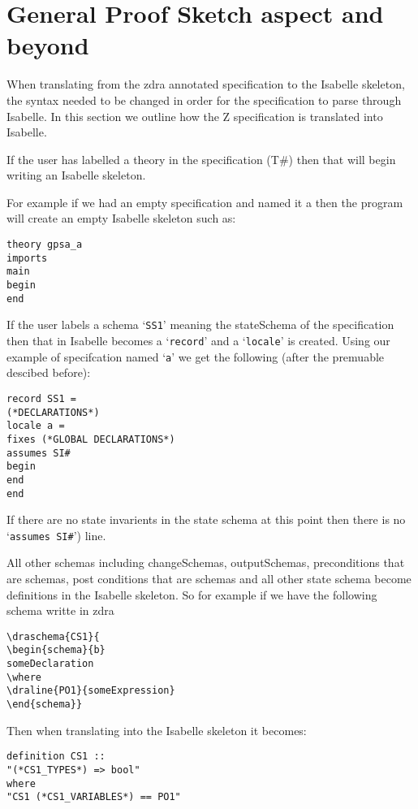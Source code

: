 \chapter{General Proof Sketch aspect and beyond}
\label{chap:gpsa2isa}

When translating from the \gls{zdra} annotated specification to the Isabelle
skeleton, the syntax needed to be changed in order for the specification to
parse through Isabelle. In this section we outline how the Z specification is
translated into Isabelle.

If the user has labelled a theory in the specification (T\#) then that will
begin writing an Isabelle skeleton.

For example if we had an empty specification and named it a then the program
will create an empty Isabelle skeleton such as:

\begin{verbatim}
theory gpsa_a
imports
main
begin
end
\end{verbatim}

If the user labels a schema `\texttt{SS1}' meaning the stateSchema of the
specification then that in Isabelle becomes a `\texttt{record}' and a
`\texttt{locale}' is created. Using our example of specifcation named
`\texttt{a}' we get the following (after the premuable descibed before):
\begin{verbatim}
record SS1 =
(*DECLARATIONS*)
locale a =
fixes (*GLOBAL DECLARATIONS*)
assumes SI#
begin
end
end
\end{verbatim}

If there are no state invarients in the state schema at this point then there is
no `\texttt{assumes SI\#}') line.

All other schemas including changeSchemas, outputSchemas, preconditions that are
schemas, post conditions that are schemas and all other state schema become
definitions in the Isabelle skeleton. So for example if we have the following
schema writte in \gls{zdra}
\begin{verbatim}
\draschema{CS1}{
\begin{schema}{b}
someDeclaration
\where
\draline{PO1}{someExpression}
\end{schema}}
\end{verbatim}

Then when translating into the Isabelle skeleton it becomes:
\begin{verbatim}
definition CS1 ::
"(*CS1_TYPES*) => bool"
where
"CS1 (*CS1_VARIABLES*) == PO1"
\end{verbatim}

